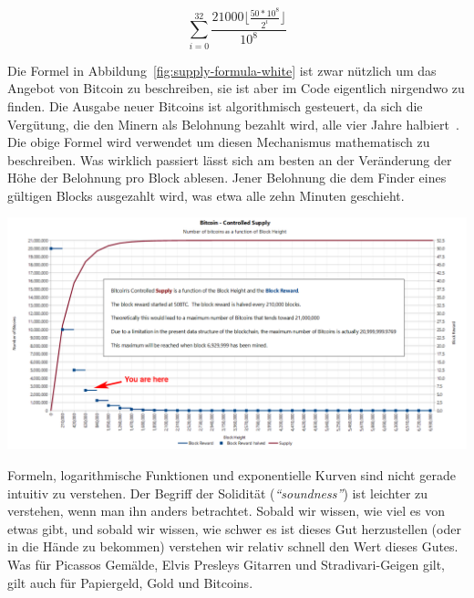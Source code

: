 \begin{center}
  \centering
  \begin{equation}
  \sum\limits_{i=0}^{32} \frac{21000 \lfloor \frac{50*10^8}{2^i} \rfloor}{10^8}
  \end{equation}
  \label{fig:supply-formula-white}
\end{center}

Die Formel in Abbildung~\ref{fig:supply-formula-white} ist zwar nützlich um das
Angebot von Bitcoin zu beschreiben, sie ist aber im Code eigentlich nirgendwo zu
finden. Die Ausgabe neuer Bitcoins ist algorithmisch gesteuert, da sich die
Vergütung, die den Minern als Belohnung bezahlt wird, alle vier Jahre
halbiert~\cite{btcwiki:supply}. Die obige Formel wird verwendet um diesen
Mechanismus mathematisch zu beschreiben. Was wirklich passiert lässt sich am
besten an der Veränderung der Höhe der Belohnung pro Block ablesen. Jener
Belohnung die dem Finder eines gültigen Blocks ausgezahlt wird, was etwa alle zehn
Minuten geschieht.

\begin{center}
  \includegraphics[width=\textwidth]{assets/images/you-are-here.png}
  \label{fig:you-are-here.png}
\end{center}

Formeln, logarithmische Funktionen und exponentielle Kurven sind nicht gerade
intuitiv zu verstehen. Der Begriff der Solidität (\textit{\enquote{soundness}})
ist leichter zu verstehen, wenn man ihn anders betrachtet. Sobald wir wissen, wie
viel es von etwas gibt, und sobald wir wissen, wie schwer es ist dieses Gut
herzustellen (oder in die Hände zu bekommen) verstehen wir relativ schnell den
Wert dieses Gutes. Was für Picassos Gemälde, Elvis Presleys Gitarren und
Stradivari-Geigen gilt, gilt auch für Papiergeld, Gold und Bitcoins.


